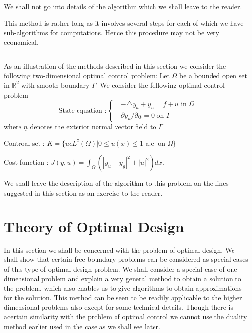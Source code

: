 We shall not go into details of the algorithm which we shall leave to the reader.

\begin{remark}\label{chap6-rem1.7} 
This method is rather long as it involves several steps for each of
which we have sub-algorithms for computations. Hence this procedure
may not be very economical. 
\end{remark}

\setcounter{subsection}{45}
\subsection{}%
As an illustration of the methods described in this section we
consider the following two-dimensional optimal control problem: Let
$\Omega$ be a bounded open set in $\mathbb{R}^{2}$ with smooth
boundary $\Gamma$. We consider the following optimal control problem  
\begin{equation*}
\text{ State equation :}
\begin{cases}
& -\triangle y_{u} + y_{u} = f + u \text{ in } \Omega\\
& \partial y_{u} / \partial \underline{n} = 0 \text{ on } \Gamma
\end{cases}
\end{equation*}
where $\underline{n}$ denotes the exterior normal vector field to $\Gamma$

Controal set : \qquad $K = \{u \epsilon L^{2} (\Omega) | 0 \leq u(x) \leq 1$ a.e. on $\Omega \}$

Cost function : \qquad $J(y, u) = \int_{\Omega} (|y_{u} - y_{g}|^{2} + |u|^{2}) dx$.

We shall leave the description of the algorithm to this problem on the
lines suggested in this section as an exercise to the reader. 

\section{Theory of Optimal Design}\label{chap6-sec2}

In this section we shall be concerned with the problem of optimal
design. We shall show that certain free boundary problems can be
considered as special cases of this type of optimal design problem. We
shall consider a special case of one-dimensional problem and explain a
very general method to obtain a solution to the problem, which also
enables us to give algorithms to obtain approximations for the
solution. This method can be seen to be readily applicable to the
higher dimensional problems also except for some technical
details. Though there is a\pageoriginale certain similarity  with the
problem of optimal control we cannot use the duality method earlier
used in the case as we shall see later. 

